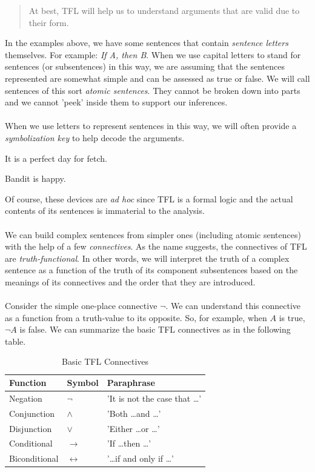 \begin{quote}
  At best, TFL will help us to understand arguments that are valid due to
  their form. \cite[][p30]{Mag25}
\end{quote}

In the examples above, we have some sentences that contain \textit{sentence
letters} themselves. For example: \textit{If A, then B}. When we use capital
letters to stand for sentences (or subsentences) in this way, we are assuming
that the sentences represented are somewhat simple and can be assessed as true
or false. We will call sentences of this sort \textit{atomic sentences}. They
cannot be broken down into parts and we cannot 'peek' inside them to support
our inferences.
\\ \\
When we use letters to represent sentences in this way, we will often provide a
\textit{symbolization key} to help decode the arguments.

\begin{argument}
\item[A:] It is a perfect day for fetch.  
\item[C:] Bandit is happy.
\end{argument}

Of course, these devices are \textit{ad hoc} since TFL is a formal logic and
the actual contents of its sentences is immaterial to the analysis.
\\ \\ 
We can build complex sentences from simpler ones (including atomic sentences)
with the help of a few \textit{connectives}. As the name suggests, the
connectives of TFL are \textit{truth-functional}. In other words, we will
interpret the truth of a complex sentence as a function of the truth of its
component subsentences based on the meanings of its connectives and the order
that they are introduced.
\\ \\
Consider the simple one-place connective $\lnot$. We can understand this
connective as a function from a truth-value to its opposite. So, for example,
when $A$ is true, $\lnot A$ is false. We can summarize the basic TFL
connectives as in the following table.

\begin{table}[h]
\centering
\begin{tabular}{|l|l|l|}
\hline
\textbf{Function} & \textbf{Symbol} & \textbf{Paraphrase} \\
\hline
Negation & $\lnot$ & 'It is not the case that \dots' \\
Conjunction & $\land$ & 'Both \dots and \dots' \\
Disjunction & $\lor$ & 'Either \dots or \dots' \\
Conditional & $\rightarrow$ & 'If \dots then \dots' \\
Biconditional & $\leftrightarrow$ & '\dots if and only if \dots' \\
\hline
\end{tabular}
\caption{Basic TFL Connectives}
\label{tab:tflconnectives}
\end{table}

